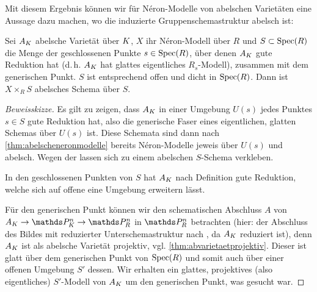 \documentclass[german]{scrreprt}
\begin{document}
Mit diesem Ergebnis können wir für Néron-Modelle von
abelschen Varietäten eine Aussage dazu machen, wo die induzierte
Gruppenschemastruktur abelsch ist:
\begin{Satz}
  \cite[1.4, Theorem 3]{neron}
  Sei $A_{K}$ abelsche Varietät über $K$,
  $X$ ihr Néron-Modell über $R$ und
  $S\subset\operatorname{Spec}(R)$ die Menge der geschlossenen Punkte
  $s\in\operatorname{Spec}(R)$, über denen $A_{K}$ gute Reduktion hat (d.\,h. $A_{K}$
  hat glattes eigentliches $R_s$-Modell), zusammen mit dem generischen
  Punkt.
  $S$ ist entsprechend offen und dicht in $\operatorname{Spec}(R)$.
  Dann ist $X\times_R S$ abelsches Schema über $S$.
  \begin{proof}[Beweisskizze]
    Es gilt zu zeigen, dass $A_{K}$ in einer Umgebung $U(s)$ jedes
    Punktes $s\in S$ gute Reduktion hat, also die generische Faser eines
    eigentlichen, glatten Schemas über $U(s)$ ist.
    Diese Schemata sind dann nach \ref{thm:abelscheneronmodelle}
    bereits Néron-Modelle jeweis über $U(s)$ und abelsch.
    Wegen der \NAbbEig lassen sich zu einem abelschen $S$-Schema
    verkleben.

    In den geschlossenen Punkten von $S$ hat $A_{K}$ nach Definition
    gute Reduktion, welche sich auf offene eine Umgebung erweitern
    lässt.
    
    Für den generischen Punkt können wir den schematischen
    Abschluss $A$ von $A_\K\to\P_\K^n\to\P_R^n$ in $\P_R^n$
    betrachten
    (hier: der Abschluss des Bildes mit reduzierter
    Unterschemastruktur nach \cite[Remark 10.32]{wedhorn}, da $A_{K}$
    reduziert ist),
    denn $A_{K}$ ist als abelsche Varietät projektiv,
    vgl. \ref{thm:abvarietaetprojektiv}.
    Dieser ist glatt über dem generischen Punkt von $\operatorname{Spec}(R)$
    und somit auch über einer offenen Umgebung $S'$ dessen.
    Wir erhalten ein glattes, projektives (also eigentliches)
    $S'$-Modell von $A_{K}$ um den generischen Punkt, was gesucht war.
  \end{proof}
\end{Satz}


\end{document}
